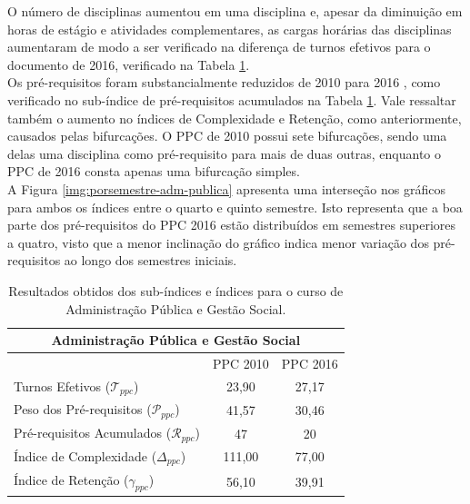 \documentclass[a4paper, 12pt]{article}
\begin{document}
O número de disciplinas aumentou em uma disciplina e, apesar da diminuição em horas de estágio e atividades complementares, as cargas horárias das disciplinas aumentaram 
de modo a ser verificado na diferença de turnos efetivos para o documento de 2016, verificado na Tabela \ref{tab:adm-publica}. \\

Os pré-requisitos foram substancialmente reduzidos de 2010 \cite{adm-publica2010} para 2016 \cite{adm-publica2016}, como verificado no sub-índice de pré-requisitos acumulados na Tabela \ref{tab:adm-publica}. 
Vale ressaltar também o aumento no índices de Complexidade e Retenção, como anteriormente, causados pelas bifurcações. O PPC de 2010 possui sete bifurcações, 
sendo uma delas uma disciplina como pré-requisito para mais de duas outras, 
enquanto o PPC de 2016 consta apenas uma bifurcação simples. \\

A Figura \ref{img:porsemestre-adm-publica} apresenta uma interseção nos gráficos para ambos os índices entre o quarto e quinto semestre. Isto representa que 
a boa parte dos pré-requisitos do PPC 2016 estão distribuídos em semestres superiores a quatro, visto que a menor inclinação do gráfico indica menor variação 
dos pré-requisitos ao longo dos semestres iniciais. \\


\begin{center}
\begin{table}[h]
\centering
\begin{tabular}{|l|c|c|}
\hline
\multicolumn{3}{|c|}{Administração Pública e Gestão Social} \\ 
\hline\hline
	& PPC 2010 & PPC 2016 \\
\hline
Turnos Efetivos ($\mathcal{T}_{ppc}$) & 23,90 & 27,17 \\
\hline
Peso dos Pré-requisitos ($\mathcal{P}_{ppc}$) & 41,57 & 30,46 \\
\hline
Pré-requisitos Acumulados ($\mathcal{R}_{ppc}$) & 47 & 20 \\
\hline
Índice de Complexidade ($\Delta_{ppc}$) & 111,00 & 77,00 \\
\hline
Índice de Retenção ($\gamma_{ppc}$) & 56,10 & 39,91 \\ 
\hline
\end{tabular}
\caption{Resultados obtidos dos sub-índices e índices para o curso de Administração Pública e Gestão Social.}
\label{tab:adm-publica}
\end{table}
\end{center}
\end{document}
